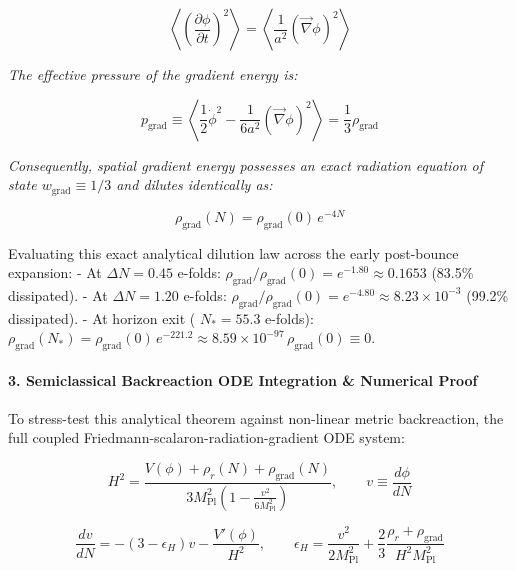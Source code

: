 \documentclass[11pt,a4paper]{article}
\theoremstyle{definition}\newtheorem{definition}{Definition}
\theoremstyle{remark}\newtheorem{remark}{Remark}
\begin{document}
\begin{equation}
\left\langle \left(\frac{\partial\phi}{\partial t}\right)^2 \right\rangle = \left\langle \frac{1}{a^2} (\vec{\nabla}\phi)^2 \right\rangle
\end{equation}


\textit{The effective pressure of the gradient energy is:}


\begin{equation}
p_{\text{grad}} \equiv \left\langle \frac{1}{2} \dot{\phi}^2 - \frac{1}{6a^2} (\vec{\nabla}\phi)^2 \right\rangle = \frac{1}{3} \rho_{\text{grad}}
\end{equation}


\textit{Consequently, spatial gradient energy possesses an exact radiation equation of state $w_{\text{grad}} \equiv 1/3$ and dilutes identically as:}


\begin{equation}
\boxed{\rho_{\text{grad}}(N) = \rho_{\text{grad}}(0) \, e^{-4N}}
\end{equation}


Evaluating this exact analytical dilution law across the early post-bounce expansion:
- At $\Delta N = 0.45$ e-folds: $\rho_{\text{grad}} / \rho_{\text{grad}}(0) = e^{-1.80} \approx 0.1653$ (83.5\% dissipated).
- At $\Delta N = 1.20$ e-folds: $\rho_{\text{grad}} / \rho_{\text{grad}}(0) = e^{-4.80} \approx 8.23 \times 10^{-3}$ (99.2\% dissipated).
- At horizon exit ( $N_* = 55.3$ e-folds): $\rho_{\text{grad}}(N_*) = \rho_{\text{grad}}(0) \, e^{-221.2} \approx 8.59 \times 10^{-97} \, \rho_{\text{grad}}(0) \equiv 0$.
\paragraph{3. Semiclassical Backreaction ODE Integration \& Numerical Proof}

To stress-test this analytical theorem against non-linear metric backreaction, the full coupled Friedmann-scalaron-radiation-gradient ODE system:


\begin{equation}
H^2 = \frac{V(\phi) + \rho_r(N) + \rho_{\text{grad}}(N)}{3 M_{\text{Pl}}^2 \left(1 - \frac{v^2}{6 M_{\text{Pl}}^2}\right)}, \qquad v \equiv \frac{d\phi}{dN}
\end{equation}



\begin{equation}
\frac{dv}{dN} = -(3 - \epsilon_H) v - \frac{V'(\phi)}{H^2}, \qquad \epsilon_H = \frac{v^2}{2 M_{\text{Pl}}^2} + \frac{2}{3} \frac{\rho_r + \rho_{\text{grad}}}{H^2 M_{\text{Pl}}^2}
\end{equation}
\end{document}
